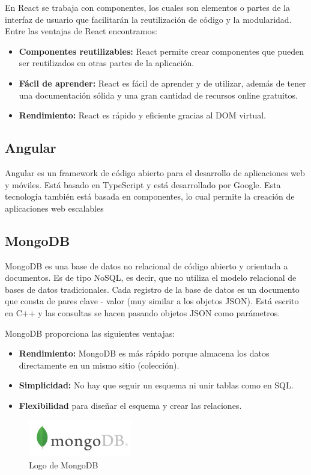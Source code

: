 En React se trabaja con componentes, los cuales son elementos o partes de la interfaz de usuario que facilitarán la reutilización de código y la modularidad.
\newpage
Entre las ventajas de React encontramos:
\begin{itemize}
\item \textbf{Componentes reutilizables:} React permite crear componentes que pueden ser reutilizados en otras partes de la aplicación.
\item \textbf{Fácil de aprender:} React es fácil de aprender y de utilizar, además de tener una documentación sólida y una gran cantidad de recursos online gratuitos.
\item \textbf{Rendimiento:} React es rápido y eficiente gracias al DOM virtual.
\end{itemize}

\subsection{Angular}
Angular es un framework de código abierto para el desarrollo de aplicaciones web y móviles. Está basado en TypeScript y está desarrollado por Google.
Esta tecnología también está basada en componentes, lo cual permite la creación de aplicaciones web escalables

\subsection{MongoDB}
MongoDB es una base de datos no relacional de código abierto y orientada a documentos. 
Es de tipo NoSQL, es decir, que no utiliza el modelo relacional de bases de datos tradicionales.
Cada registro de la base de datos es un documento que consta de pares clave - valor (muy similar a los objetos JSON).
Está escrito en C++ y las consultas se hacen pasando objetos JSON como parámetros.

MongoDB proporciona las siguientes ventajas:
\begin{itemize}
\item \textbf{Rendimiento:} MongoDB es más rápido porque almacena los datos directamente en un mismo sitio (colección).
\item \textbf{Simplicidad:} No hay que seguir un esquema ni unir tablas como en SQL.
\item  \textbf{Flexibilidad} para diseñar el esquema y crear las relaciones.
\end{itemize}
\begin{figure}[H]
    \centering
    \includegraphics[width=0.4\textwidth]{imagenes/c2/mongodb.png}
    \caption{Logo de MongoDB}
\end{figure}

